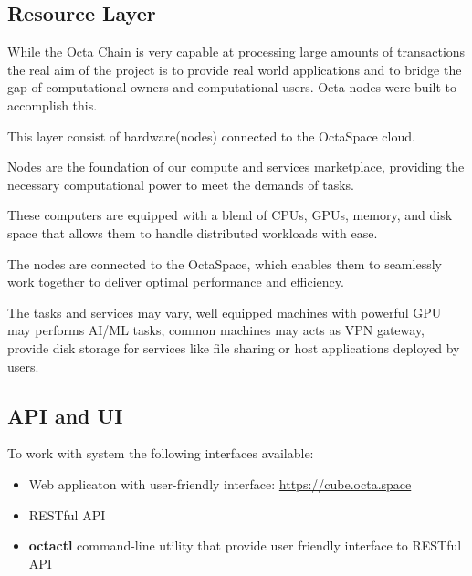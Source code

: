 \subsection{Resource Layer}
While the Octa Chain is very capable at processing large amounts of transactions the real aim of the project is to provide real world applications and to bridge the gap of computational owners and computational users. Octa nodes were built to accomplish this.

This layer consist of hardware(nodes) connected to the OctaSpace cloud.

Nodes are the foundation of our compute and services marketplace, providing the necessary computational power to meet the demands of tasks.

These computers are equipped with a blend of CPUs, GPUs, memory, and disk space that allows them to handle distributed workloads with ease.

The nodes are connected to the OctaSpace, which enables them to seamlessly work together to deliver optimal performance and efficiency.

The tasks and services may vary, well equipped machines with powerful GPU may performs AI/ML tasks, common machines may acts as VPN gateway, provide disk storage for services like file sharing or host applications deployed by users.

\subsection{API and UI}

To work with system the following interfaces available:

\begin{itemize}
    \item Web applicaton with user-friendly interface: \url{https://cube.octa.space}
    \item RESTful API
    \item \textbf{octactl} command-line utility that provide user friendly interface to RESTful API
\end{itemize}

